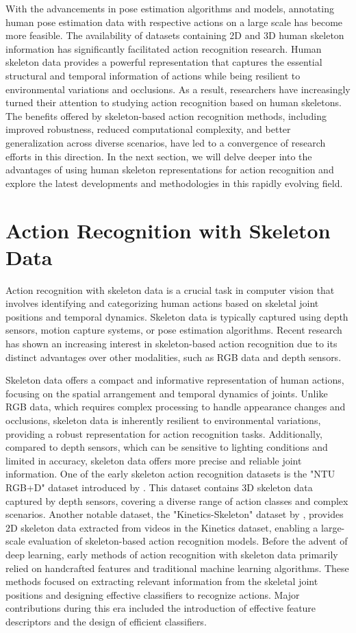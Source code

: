 With the advancements in pose estimation algorithms and models, annotating human pose estimation data with respective actions on a large scale has become more feasible. The availability of datasets containing 2D and 3D human skeleton information has significantly facilitated action recognition research. Human skeleton data provides a powerful representation that captures the essential structural and temporal information of actions while being resilient to environmental variations and occlusions. As a result, researchers have increasingly turned their attention to studying action recognition based on human skeletons. The benefits offered by skeleton-based action recognition methods, including improved robustness, reduced computational complexity, and better generalization across diverse scenarios, have led to a convergence of research efforts in this direction. In the next section, we will delve deeper into the advantages of using human skeleton representations for action recognition and explore the latest developments and methodologies in this rapidly evolving field.

\section{Action Recognition with Skeleton Data}
Action recognition with skeleton data is a crucial task in computer vision that involves identifying and categorizing human actions based on skeletal joint positions and temporal dynamics. Skeleton data is typically captured using depth sensors, motion capture systems, or pose estimation algorithms. Recent research has shown an increasing interest in skeleton-based action recognition due to its distinct advantages over other modalities, such as RGB data and depth sensors.

Skeleton data offers a compact and informative representation of human actions, focusing on the spatial arrangement and temporal dynamics of joints. Unlike RGB data, which requires complex processing to handle appearance changes and occlusions, skeleton data is inherently resilient to environmental variations, providing a robust representation for action recognition tasks. Additionally, compared to depth sensors, which can be sensitive to lighting conditions and limited in accuracy, skeleton data offers more precise and reliable joint information. One of the early skeleton action recognition datasets is the "NTU RGB+D" dataset introduced by \cite{shahroudy2016ntu}. This dataset contains 3D skeleton data captured by depth sensors, covering a diverse range of action classes and complex scenarios. Another notable dataset, the "Kinetics-Skeleton" dataset by \cite{kay2017kinetics}, provides 2D skeleton data extracted from videos in the Kinetics dataset, enabling a large-scale evaluation of skeleton-based action recognition models. Before the advent of deep learning, early methods of action recognition with skeleton data primarily relied on handcrafted features and traditional machine learning algorithms. These methods focused on extracting relevant information from the skeletal joint positions and designing effective classifiers to recognize actions. Major contributions during this era included the introduction of effective feature descriptors and the design of efficient classifiers.

